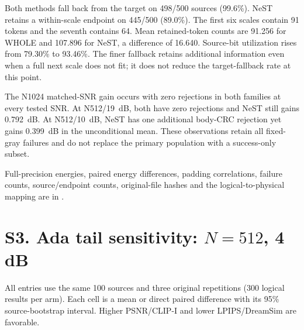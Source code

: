 \documentclass[11pt,letterpaper]{article}
\begin{document}
Both methods fall back from the target on 498/500 sources (99.6\%). NeST retains a within-scale endpoint on 445/500 (89.0\%). The first six scales contain 91 tokens and the seventh contains 64. Mean retained-token counts are 91.256 for WHOLE and 107.896 for NeST, a difference of 16.640. Source-bit utilization rises from 79.30\% to 93.46\%. The finer fallback retains additional information even when a full next scale does not fit; it does not reduce the target-fallback rate at this point.

The N1024 matched-SNR gain occurs with zero rejections in both families at every tested SNR. At N512/19~dB, both have zero rejections and NeST still gains 0.792~dB. At N512/10~dB, NeST has one additional body-CRC rejection yet gains 0.399~dB in the unconditional mean. These observations retain all fixed-gray failures and do not replace the primary population with a success-only subset.

Full-precision energies, paired energy differences, padding correlations, failure counts, source/endpoint counts, original-file hashes and the logical-to-physical mapping are in
.

\clearpage\section*{S3. Ada tail sensitivity: $N=512$, 4 dB}
All entries use the same 100 sources and three original repetitions (300 logical results per arm). Each cell is a mean or direct paired difference with its 95\% source-bootstrap interval. Higher PSNR/CLIP-I and lower LPIPS/DreamSim are favorable.
\end{document}
